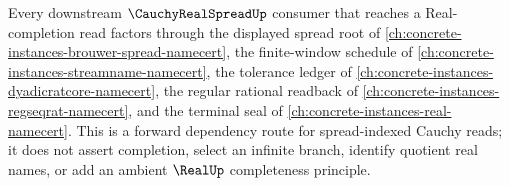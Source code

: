 Every downstream $\CauchyRealSpreadUp$ consumer that reaches a Real-completion read factors through the displayed spread root of \autoref{ch:concrete-instances-brouwer-spread-namecert}, the finite-window schedule of \autoref{ch:concrete-instances-streamname-namecert}, the tolerance ledger of \autoref{ch:concrete-instances-dyadicratcore-namecert}, the regular rational readback of \autoref{ch:concrete-instances-regseqrat-namecert}, and the terminal seal of \autoref{ch:concrete-instances-real-namecert}. This is a forward dependency route for spread-indexed Cauchy reads; it does not assert completion, select an infinite branch, identify quotient real names, or add an ambient $\RealUp$ completeness principle.

